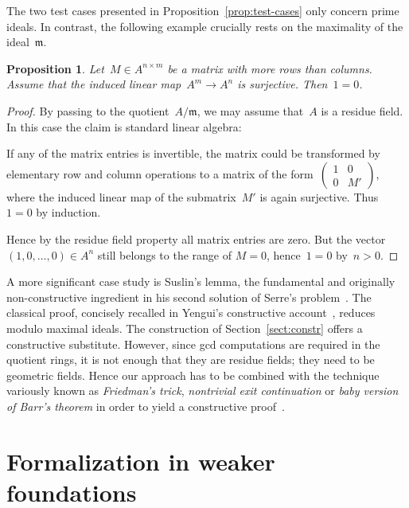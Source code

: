 \documentclass[com,11pt,crcready]{iosart2x}
\theoremstyle{definition}
\theoremstyle{plain}
\newtheorem{proposition}[definition]{Proposition}
\theoremstyle{remark}
\newcommand{\?}{\,{:}\,}
\newcommand{\mmm}{\mathfrak{m}}
\renewcommand{\_}{\mathpunct{.}\,}
\begin{document}
The two test cases presented in Proposition~\ref{prop:test-cases} only concern
prime ideals. In contrast, the following example crucially rests on the
maximality of the ideal~$\mmm$.

\begin{proposition}\label{prop:surj-matrix}Let~$M \in A^{n \times m}$ be a matrix with more rows than
columns. Assume that the induced linear map~$A^m \to A^n$ is surjective.
Then~$1 = 0$.
\end{proposition}

\begin{proof}By passing to the quotient~$A/\mmm$, we may assume that~$A$ is a
residue field. In this case the claim is standard linear algebra:

If any of the matrix entries
is invertible, the matrix could be transformed by elementary row and
column operations to a matrix of the form~$\left(\begin{smallmatrix}1 & 0 \\ 0 &
M'\end{smallmatrix}\right)$, where the induced linear map of the submatrix~$M'$ is again
surjective. Thus~$1 = 0$ by induction.

Hence by the residue field property all matrix entries are zero.
But the vector $(1,0,\ldots,0)\in A^n$ still
belongs to the range of $M=0$, hence~$1=0$ by~$n > 0$.
\end{proof}

A more significant case study is Suslin's lemma, the fundamental and originally
non-constructive ingredient in his second solution of Serre's
problem~\cite{suslin:structure}. The classical proof, concisely recalled in
Yengui's constructive account~\cite{yengui:maximal}, reduces modulo
maximal ideals. The construction of Section~\ref{sect:constr} offers a
constructive substitute. However, since gcd computations
are required in the quotient rings, it is not enough that they are residue
fields; they need to be geometric fields. Hence our approach has to be combined
with the technique variously known as \emph{Friedman's trick}, \emph{nontrivial
exit continuation} or \emph{baby version of Barr's theorem} in order to yield a
constructive
proof~\cite{friedman:trick,murthy:classical-proofs,barr:without-points,blechschmidt:generalized-spaces}.


\section{Formalization in weaker foundations}
\label{sect:arithmetization}
\end{document}
